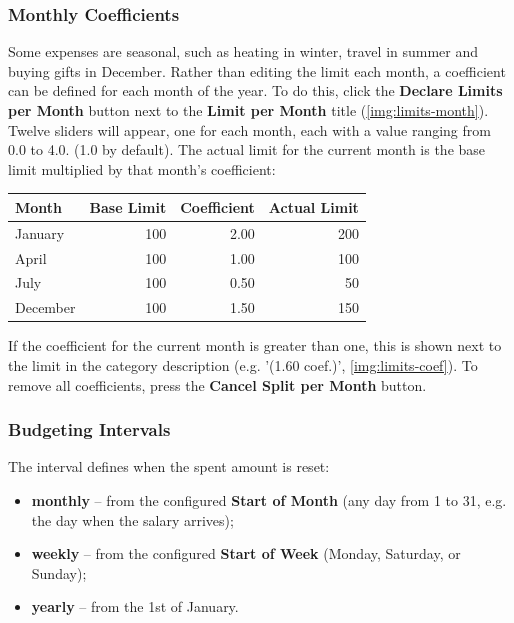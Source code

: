 \subsubsection{Monthly Coefficients}
\label{budget:coef}

Some expenses are seasonal, such as heating in winter, travel in summer and buying gifts in
December. Rather than editing the limit each month, a coefficient can be defined for each
month of the year. To do this, click the \textbf{Declare Limits per Month} button next to the
\textbf{Limit per Month} title (\cref{img:limits-month}). Twelve sliders will appear, one for
each month, each with a value ranging from 0.0 to 4.0. (1.0 by default). The actual limit for
the current month is the base limit multiplied by that month's coefficient:


\begin{center}
\begin{tabular}{|l|r|r|r|}
  \hline
  \textbf{Month} & \textbf{Base Limit} & \textbf{Coefficient} & \textbf{Actual Limit} \\
  \hline
  January  & 100 & 2.00 & 200 \\
  April    & 100 & 1.00 & 100 \\
  July     & 100 & 0.50 &  50 \\
  December & 100 & 1.50 & 150 \\
  \hline
\end{tabular}
\end{center}

\noindent If the coefficient for the current month is greater than one, this is shown next to
the limit in the category description (e.g. '(1.60 coef.)', \cref{img:limits-coef}). To
remove all coefficients, press the \textbf{Cancel Split per Month} button.



\subsubsection{Budgeting Intervals}

The interval defines when the spent amount is reset:

\begin{itemize}
  \item \textbf{monthly} -- from the configured \textbf{Start of Month} (any day from 1 to
  31, e.g. the day when the salary arrives);
  \item \textbf{weekly} -- from the configured \textbf{Start of Week} (Monday, Saturday, or
  Sunday);
  \item \textbf{yearly} -- from the 1st of January.
\end{itemize}

